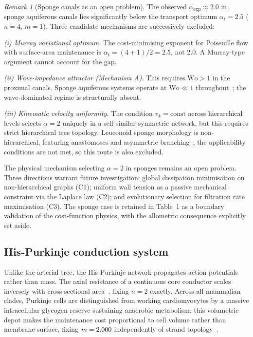 \documentclass[11pt,a4paper]{article}
\theoremstyle{remark}
\newtheorem{remark}{Remark}
\begin{document}
\begin{remark}[Sponge canals as an open problem]
\label{sec:sponge_open}
The observed $\alpha_{\exp} \approx 2.0$ in sponge aquiferous canals lies
significantly below the transport optimum $\alpha_t = 2.5$ ($n=4$, $m=1$).
Three candidate mechanisms are successively excluded:

\textit{(i) Murray variational optimum.} The cost-minimising exponent for
Poiseuille flow with surface-area maintenance is $\alpha_t = (4+1)/2 = 2.5$,
not 2.0. A Murray-type argument cannot account for the gap.

\textit{(ii) Wave-impedance attractor (Mechanism A).} This requires
$\mathrm{Wo} > 1$ in the proximal canals. Sponge aquiferous systems operate
at $\mathrm{Wo} \ll 1$ throughout~\cite{reiswig1975}; the wave-dominated
regime is structurally absent.

\textit{(iii) Kinematic velocity uniformity.} The condition
$v_k = \mathrm{const}$ across hierarchical levels selects $\alpha = 2$
uniquely in a self-similar symmetric network, but this requires strict
hierarchical tree topology. Leuconoid sponge morphology is non-hierarchical,
featuring anastomoses and asymmetric branching~\cite{hammel2012}; the
applicability conditions are not met, so this route is also excluded.

The physical mechanism selecting $\alpha = 2$ in sponges remains an open
problem. Three directions warrant future investigation: global dissipation
minimisation on non-hierarchical graphs (C1); uniform wall tension as a
passive mechanical constraint via the Laplace law (C2); and evolutionary
selection for filtration rate maximisation (C3). The sponge case is retained
in Table~1 as a boundary validation of the cost-function physics, with the
allometric consequence explicitly set aside.
\end{remark}

\subsection{His-Purkinje conduction system}

Unlike the arterial tree, the His-Purkinje network propagates action potentials
rather than mass. The axial resistance of a continuous core conductor scales
inversely with cross-sectional area~\cite{weidmann1952}, fixing $n=2$ exactly.
Across all mammalian clades, Purkinje cells are distinguished from working
cardiomyocytes by a massive intracellular glycogen reserve sustaining anaerobic
metabolism; this volumetric depot makes the maintenance cost proportional to
cell volume rather than membrane surface, fixing $m=2.000{}$ independently of
strand topology~\cite{ono2009}.
\end{document}
